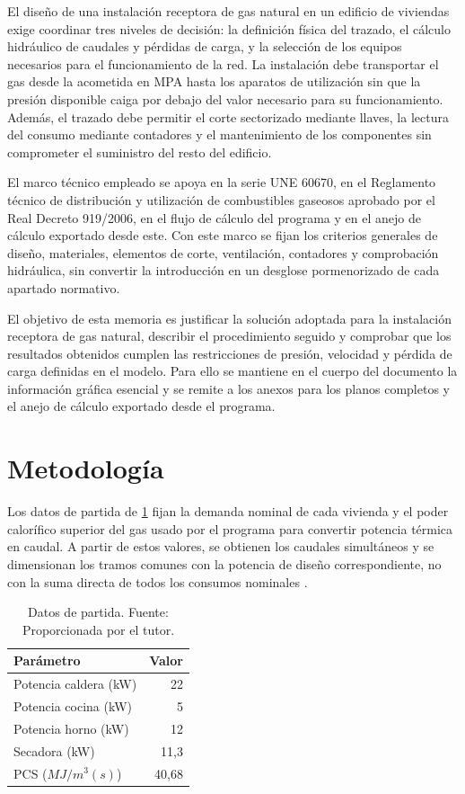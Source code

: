 \documentclass[12pt,a4paper]{article}
\begin{document}
El diseño de una instalación receptora de gas natural en un edificio de viviendas exige coordinar tres niveles de decisión: la definición física del trazado, el cálculo hidráulico de caudales y pérdidas de carga, y la selección de los equipos necesarios para el funcionamiento de la red. La instalación debe transportar el gas desde la acometida en MPA hasta los aparatos de utilización sin que la presión disponible caiga por debajo del valor necesario para su funcionamiento. Además, el trazado debe permitir el corte sectorizado mediante llaves, la lectura del consumo mediante contadores y el mantenimiento de los componentes sin comprometer el suministro del resto del edificio.

El marco técnico empleado se apoya en la serie UNE 60670, en el Reglamento técnico de distribución y utilización de combustibles gaseosos aprobado por el Real Decreto 919/2006, en el flujo de cálculo del programa y en el anejo de cálculo exportado desde este. Con este marco se fijan los criterios generales de diseño, materiales, elementos de corte, ventilación, contadores y comprobación hidráulica, sin convertir la introducción en un desglose pormenorizado de cada apartado normativo.

El objetivo de esta memoria es justificar la solución adoptada para la instalación receptora de gas natural, describir el procedimiento seguido y comprobar que los resultados obtenidos cumplen las restricciones de presión, velocidad y pérdida de carga definidas en el modelo. Para ello se mantiene en el cuerpo del documento la información gráfica esencial y se remite a los anexos para los planos completos y el anejo de cálculo exportado desde el programa.

\section{Metodología}

Los datos de partida de \cref{tab:datos_partida} fijan la demanda nominal de cada vivienda y el poder calorífico superior del gas usado por el programa para convertir potencia térmica en caudal. A partir de estos valores, se obtienen los caudales simultáneos y se dimensionan los tramos comunes con la potencia de diseño correspondiente, no con la suma directa de todos los consumos nominales \cite{UNE60670_4_2023,DMElectManual}.

\begin{table}[H]
	\centering
	\caption{Datos de partida. Fuente: Proporcionada por el tutor.}
	\label{tab:datos_partida}
	\begin{tabular}{lr}
		\toprule
		Parámetro & Valor \\
		\midrule
		Potencia caldera (kW) & 22 \\
		Potencia cocina (kW) & 5 \\
		Potencia horno (kW) & 12 \\
		Secadora (kW) & 11,3 \\
		PCS ($MJ/m^3(s)$) & 40,68 \\
		\bottomrule
	\end{tabular}
\end{table}
\end{document}
